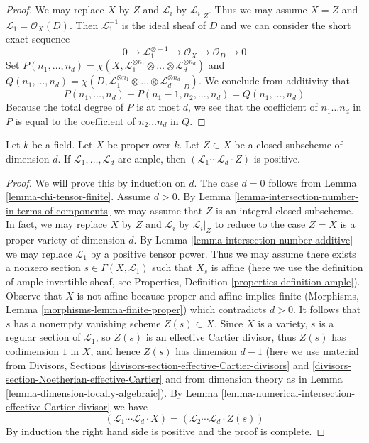 \begin{proof}
We may replace $X$ by $Z$ and $\mathcal{L}_i$ by $\mathcal{L}_i|_Z$.
Thus we may assume $X = Z$ and $\mathcal{L}_1 = \mathcal{O}_X(D)$.
Then $\mathcal{L}_1^{-1}$ is the ideal sheaf of $D$ and we can
consider the short exact sequence
$$
0 \to \mathcal{L}_1^{\otimes -1} \to \mathcal{O}_X \to \mathcal{O}_D \to 0
$$
Set
$P(n_1, \ldots, n_d) =
\chi(X, \mathcal{L}_1^{\otimes n_1} \otimes \ldots \otimes
\mathcal{L}_d^{\otimes n_d})$
and
$Q(n_1, \ldots, n_d) =
\chi(D, \mathcal{L}_1^{\otimes n_1} \otimes \ldots \otimes
\mathcal{L}_d^{\otimes n_d}|_D)$.
We conclude from additivity that
$$
P(n_1, \ldots, n_d) - P(n_1 - 1, n_2, \ldots, n_d) =
Q(n_1, \ldots, n_d)
$$
Because the total degree of $P$ is at most $d$, we see that
the coefficient of $n_1 \ldots n_d$ in $P$ is equal to the coefficient
of $n_2 \ldots n_d$ in $Q$.
\end{proof}

\begin{lemma}
\label{lemma-ample-positive}
Let $k$ be a field. Let $X$ be proper over $k$. Let $Z \subset X$ be
a closed subscheme of dimension $d$. If $\mathcal{L}_1, \ldots, \mathcal{L}_d$
are ample, then $(\mathcal{L}_1 \cdots \mathcal{L}_d \cdot Z)$ is positive.
\end{lemma}

\begin{proof}
We will prove this by induction on $d$. The case $d = 0$
follows from Lemma \ref{lemma-chi-tensor-finite}. Assume $d > 0$.
By Lemma \ref{lemma-intersection-number-in-terms-of-components}
we may assume that $Z$ is an integral closed subscheme.
In fact, we may replace $X$ by $Z$ and $\mathcal{L}_i$
by $\mathcal{L}_i|_Z$ to reduce to the case $Z = X$ is a
proper variety of dimension $d$.
By Lemma \ref{lemma-intersection-number-additive}
we may replace $\mathcal{L}_1$ by a positive tensor power.
Thus we may assume there exists a nonzero section
$s \in \Gamma(X, \mathcal{L}_1)$
such that $X_s$ is affine (here we use the definition of
ample invertible sheaf, see
Properties, Definition \ref{properties-definition-ample}).
Observe that $X$ is not affine because proper and affine
implies finite (Morphisms, Lemma \ref{morphisms-lemma-finite-proper})
which contradicts $d > 0$. It follows that $s$ has a nonempty vanishing
scheme $Z(s) \subset X$. Since $X$ is a variety, $s$ is a regular section
of $\mathcal{L}_1$, so $Z(s)$ is an effective Cartier divisor,
thus $Z(s)$ has codimension $1$ in $X$, and
hence $Z(s)$ has dimension $d - 1$ (here we use material from
Divisors, Sections \ref{divisors-section-effective-Cartier-divisors} and
\ref{divisors-section-Noetherian-effective-Cartier} and from dimension theory
as in Lemma \ref{lemma-dimension-locally-algebraic}).
By Lemma \ref{lemma-numerical-intersection-effective-Cartier-divisor}
we have
$$
(\mathcal{L}_1 \cdots \mathcal{L}_d \cdot X) =
(\mathcal{L}_2 \cdots \mathcal{L}_d \cdot Z(s))
$$
By induction the right hand side is positive and the proof is complete.
\end{proof}

